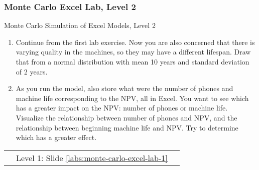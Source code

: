 \documentclass[handout, 11pt]{beamer}
\begin{document}
\begin{frame}
\frametitle{Monte Carlo Excel Lab, Level 2}
{
\begin{block}{Monte Carlo Simulation of Excel Models, Level 2}
\begin{enumerate}
\item Continue from the first lab exercise. Now you are also concerned that there is varying quality in the machines, so they may have a different lifespan. Draw that from a normal distribution with mean 10 years and standard deviation of 2 years.
\item As you run the model, also store what were the number of phones and machine life corresponding to the NPV, all in Excel. You want to see which has a greater impact on the NPV: number of phones or machine life. Visualize the relationship between number of phones and NPV, and the relationship between beginning machine life and NPV. Try to determine which has a greater effect.
\end{enumerate}
\vfill
\begin{tabular*}{\textwidth}{@{\extracolsep{\fill}}ccc}
\toprule
\hfill & Level 1: Slide \textcolor{blue}{\underline{\ref{labs:monte-carlo-excel-lab-1}}} & \hfill\\

\end{tabular*}
\end{block}
}
\label{labs:monte-carlo-excel-lab-2}
\end{frame}
\setcounter{framenumber}{\value{finalframe}}
\end{document}
